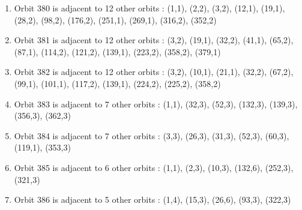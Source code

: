 \documentclass[12pt]{article}
\begin{document}
\begin{enumerate}
\item Orbit 380 is adjacent to 12 other orbits : (1,1), (2,2), (3,2), (12,1), (19,1), (28,2), (98,2), (176,2), (251,1), (269,1), (316,2), (352,2)
\item Orbit 381 is adjacent to 12 other orbits : (3,2), (19,1), (32,2), (41,1), (65,2), (87,1), (114,2), (121,2), (139,1), (223,2), (358,2), (379,1)
\item Orbit 382 is adjacent to 12 other orbits : (3,2), (10,1), (21,1), (32,2), (67,2), (99,1), (101,1), (117,2), (139,1), (224,2), (225,2), (358,2)
\item Orbit 383 is adjacent to 7 other orbits : (1,1), (32,3), (52,3), (132,3), (139,3), (356,3), (362,3)
\item Orbit 384 is adjacent to 7 other orbits : (3,3), (26,3), (31,3), (52,3), (60,3), (119,1), (353,3)
\item Orbit 385 is adjacent to 6 other orbits : (1,1), (2,3), (10,3), (132,6), (252,3), (321,3)
\item Orbit 386 is adjacent to 5 other orbits : (1,4), (15,3), (26,6), (93,3), (322,3)
\end{enumerate}
\end{document}
